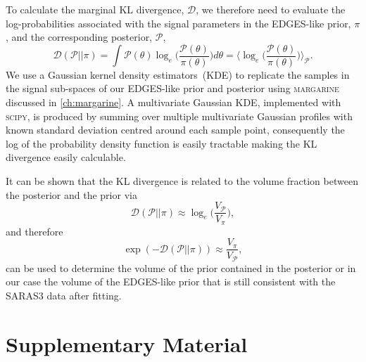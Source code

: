 To calculate the marginal KL divergence, $\mathcal{D}$, we therefore need to evaluate the log-probabilities associated with the signal parameters in the EDGES-like prior, $\pi$, and the corresponding posterior, $\mathcal{P}$,
\begin{equation}
    \mathcal{D}(\mathcal{P}||\pi) = \int \mathcal{P}(\theta) \log_{e}\bigg(\frac{\mathcal{P}(\theta)}{\pi(\theta)}\bigg) d\theta = \bigg\langle \log_{e}\bigg(\frac{\mathcal{P}(\theta)}{\pi(\theta)}\bigg) \bigg\rangle_\mathcal{P}.
\end{equation}
We use a Gaussian kernel density estimators~(KDE) to replicate the samples in the signal sub-spaces of our EDGES-like prior and posterior using \textsc{margarine} discussed in \cref{ch:margarine}. A multivariate Gaussian KDE, implemented with \textsc{scipy}, is produced by summing over multiple multivariate Gaussian profiles with known standard deviation centred around each sample point, consequently the log of the probability density function is easily tractable making the KL divergence easily calculable. 


It can be shown that the KL divergence is related to the volume fraction between the posterior and the prior via
\begin{equation}
    \mathcal{D}(\mathcal{P}||\pi) \approx \log_{e}\bigg(\frac{V_\mathcal{P}}{V_\pi}\bigg),
\end{equation}
and therefore
\begin{equation}
    \exp(-\mathcal{D}(\mathcal{P}||\pi)) \approx \frac{V_\pi}{V_\mathcal{P}},
\end{equation}
can be used to determine the volume of the prior contained in the posterior or in our case the volume of the EDGES-like prior that is still consistent with the SARAS3 data after fitting.

\renewcommand\thefigure{\arabic{chapter}.S.\arabic{figure}}
\renewcommand\thetable{\arabic{chapter}.S.\arabic{table}}
\renewcommand\thesubsection{\arabic{chapter}.S.\arabic{subsection}}
\renewcommand\thesection{\arabic{chapter}.S}
\section{Supplementary Material} \label{sec:sup_mat}

